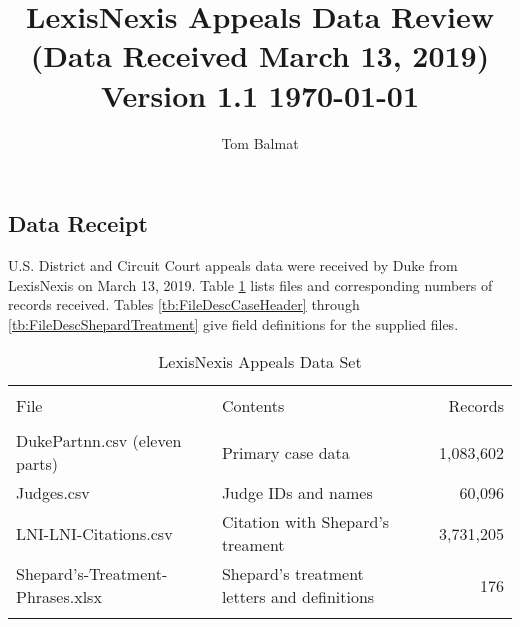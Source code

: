 \documentclass[10pt, letterpaper]{article}
\title{\large LexisNexis Appeals Data Review (Data Received March 13, 2019)\\[10pt]Version 1.1 \hspace{10pt} \today\\[-6pt]}
\author{Tom Balmat}
\date{}
\begin{document}
    
\begin{spacing}{1.0}
    
\maketitle

\section{Data Receipt}

U.S. District and Circuit Court appeals data were received by Duke from LexisNexis on March 13, 2019.  Table \ref{tb:FileSummary} lists files and corresponding numbers of records received.  Tables \ref{tb:FileDescCaseHeader} through \ref{tb:FileDescShepardTreatment} give field definitions for the supplied files.\\

\begin{table}[h!]
    \centering
    \caption{LexisNexis Appeals Data Set}
    \begin{tabular}{llllr}
      \hline\\[-8pt]
      File & & Contents & & Records \\[2pt]
      \hline\\[-6pt]
      DukePartnn.csv (eleven parts) & & Primary case data & & 1,083,602\\
      Judges.csv & & Judge IDs and names & & 60,096\\
      LNI-LNI-Citations.csv & & Citation with Shepard's treament & & 3,731,205\\
      Shepard's-Treatment-Phrases.xlsx & & Shepard's treatment letters and definitions & & 176\\ [6pt]
      \hline\\
      \end{tabular}
      \label{tb:FileSummary}
\end{table}



\end{spacing}
\end{document}
